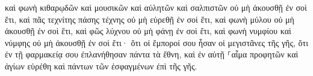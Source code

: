 \documentclass{openreader}
\begin{document}
καὶ φωνὴ κιθαρῳδῶν καὶ μουσικῶν καὶ αὐλητῶν καὶ σαλπιστῶν οὐ μὴ ἀκουσθῇ ἐν σοὶ ἔτι, καὶ πᾶς τεχνίτης πάσης τέχνης οὐ μὴ εὑρεθῇ ἐν σοὶ ἔτι, καὶ φωνὴ μύλου οὐ μὴ ἀκουσθῇ ἐν σοὶ ἔτι, 
καὶ φῶς λύχνου οὐ μὴ φάνῃ ἐν σοὶ ἔτι, καὶ φωνὴ νυμφίου καὶ νύμφης οὐ μὴ ἀκουσθῇ ἐν σοὶ ἔτι· ὅτι οἱ ἔμποροί σου ἦσαν οἱ μεγιστᾶνες τῆς γῆς, ὅτι ἐν τῇ φαρμακείᾳ σου ἐπλανήθησαν πάντα τὰ ἔθνη, 
καὶ ἐν αὐτῇ ⸀αἷμα προφητῶν καὶ ἁγίων εὑρέθη καὶ πάντων τῶν ἐσφαγμένων ἐπὶ τῆς γῆς. 
\end{document}
